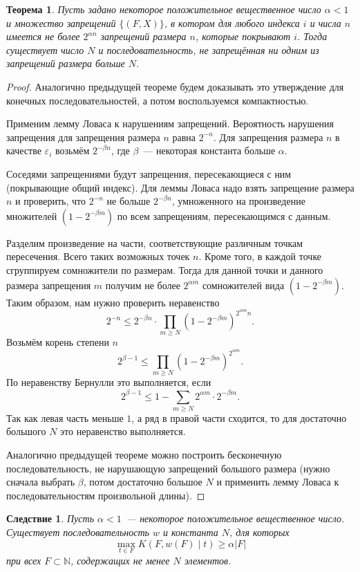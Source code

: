 \documentclass[12pt]{article}
\newcommand{\Nat}{\mathbb{N}}
\theoremstyle{definition}
\theoremstyle{plain}
\newtheorem{theorem}{Теорема}[section]
\newtheorem{corollary}{Следствие}[section]
\theoremstyle{remark}
\begin{document}
\begin{theorem}\label{thm:lll:subseq}
    Пусть задано некоторое положительное вещественное число $\alpha < 1$ и 
    множество запрещений $\{(F,X)\}$, в котором для любого индекса $i$
    и числа $n$ имеется не более $2^{\alpha n}$ запрещений размера $n$,
    которые покрывают $i$. Тогда существует число $N$ и последовательность,
    не запрещённая ни одним из запрещений размера больше $N$.
\end{theorem}
\begin{proof}
    Аналогично предыдущей теореме будем доказывать это утверждение для
    конечных последовательностей, а потом воспользуемся компактностью.

    Применим лемму Ловаса к нарушениям запрещений.
    Вероятность нарушения запрещения для запрещения размера $n$ равна $2^{-n}$.
    Для запрещения размера $n$ в качестве $\varepsilon_i$ возьмём $2^{-\beta n}$,
    где $\beta$~--- некоторая константа больше $\alpha$.

    Соседями запрещениями будут запрещения, пересекающиеся с ним (покрывающие общий индекс).
    Для леммы Ловаса надо взять запрещение размера $n$ и проверить, что $2^{-n}$ не больше $2^{-\beta n}$,
    умноженного на произведение множителей $(1-2^{-\beta m})$ по всем запрещениям, пересекающимся с данным.

    Разделим произведение на части, соответствующие различным точкам пересечения. 
    Всего таких возможных точек $n$. Кроме того, в каждой точке сгруппируем сомножители
    по размерам. Тогда для данной точки и данного размера запрещения $m$ получим не более
    $2^{\alpha m}$ сомножителей вида $(1-2^{-\beta m})$. Таким образом, нам нужно проверить
    неравенство
    \[
        2^{-n}\le 2^{-\beta n}\cdot\prod_{m\ge N} (1-2^{-\beta m})^{2^{\alpha m}n}.
    \]
    Возьмём корень степени $n$
    \[
        2^{\beta-1}\le \prod_{m\ge N} (1-2^{-\beta m})^{2^{\alpha m}}.
    \]
    По неравенству Бернулли это выполняется, если 
    \[
        2^{\beta-1}\le 1 - \sum_{m\ge N} 2^{\alpha m}\cdot 2^{-\beta m}.
    \]
    Так как левая часть меньше $1$, а ряд в правой части сходится, то для 
    достаточно большого $N$ это неравенство выполняется.

    Аналогично предыдущей теореме можно построить бесконечную последовательность,
    не нарушающую запрещений большого размера (нужно сначала выбрать $\beta$, потом
    достаточно большое $N$ и применить лемму Ловаса к последовательностям 
    произвольной длины).
\end{proof}
\begin{corollary}
    Пусть $\alpha < 1$~--- некоторое положительное вещественное число.
    Существует последовательность $w$ и константа $N$, для которых
    \[
        \max_{t\in F} K(F,w(F) \mid t) \ge \alpha |F|
    \]
    при всех $F\subset\Nat$, содержащих не менее $N$ элементов.
\end{corollary}
\end{document}
